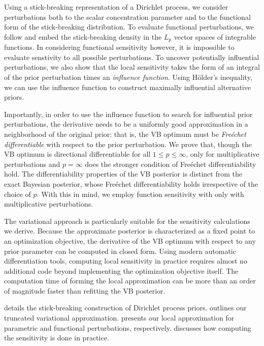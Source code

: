 Using a stick-breaking representation of a Dirichlet process, we consider
perturbations both to the scalar concentration parameter and to the functional
form of the stick-breaking distribution. To evaluate functional perturbations,
we follow \cite{gustafson:1996:local} and embed the stick-breaking density in
the $L_p$ vector spaces of integrable functions. In considering functional
sensitivity however, it is impossible to evaluate senstivity to all possible
perturbations. To uncover potentially influential perturbations, we also show
that the local sensitivity takes the form of an integral of the prior
perturbation times an \textit{influence function}. Using H{\"o}lder's
inequality, we can use the influence function to construct maximally influential
alternative priors.

Importantly, in order to use the influence function to search for
influential prior perturbations, the derivative needs to be a
uniformly good approximation in
a neighborhood of the original prior: that is, the VB optimum must be
\textit{Fre{\'e}chet differentiable} with respect to the prior perturbation.
We prove that, though the VB optimum is directional differentiable for all
$1 \le p \le \infty$,  only for multiplicative perturbations and
$p=\infty$ does the stronger condition of Fre{\'e}chet differentiability hold.
The differentiability properties of the VB posterior is distinct from the
exact Bayesian posterior, whose Fre{\'e}chet differentiability
holds irrespective of the choice of $p$.
With this in mind, we employ function sensitivity with only with multiplicative
perturbations.

The variational approach is particularly suitable for the
sensitivity calculations we derive.
Because the approximate posterior is characterized as a fixed point to an optimization
objective, the derivative of the VB optimum with respect to any prior
parameter can be computed in closed form.
Using modern automatic differentiation tools, computing local sensitivity
in practice requires almost no additional code beyond
implementing the optimization objective itself.
The computation time of forming the local approximation can be
more than an order of magnitude faster than refitting the VB posterior.

 details the stick-breaking construction of Dirichlet process
priors.  outlines our truncated variational approximation.
 presents our local approximation for parametric and
functional perturbations, respectively.  discusses
how computing the sensitivity is done in practice.


